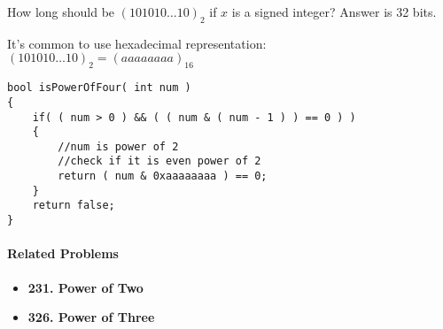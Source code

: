 How long should be $(101010\ldots 10)_2$ if $x$ is a signed integer? Answer is 32 bits. 

It's common to use hexadecimal representation: $(101010\ldots 10)_2 = (aaaaaaaa)_{16}$

\setcounter{lstlisting}{0}
\begin{lstlisting}[style=customc, caption={Bit Operation}]
bool isPowerOfFour( int num )
{
    if( ( num > 0 ) && ( ( num & ( num - 1 ) ) == 0 ) )
    {
        //num is power of 2
        //check if it is even power of 2
        return ( num & 0xaaaaaaaa ) == 0;
    }
    return false;
}
\end{lstlisting}

\paragraph{Related Problems}
\begin{itemize}
\item \textbf{231. Power of Two}
\item \textbf{326. Power of Three}
\end{itemize}